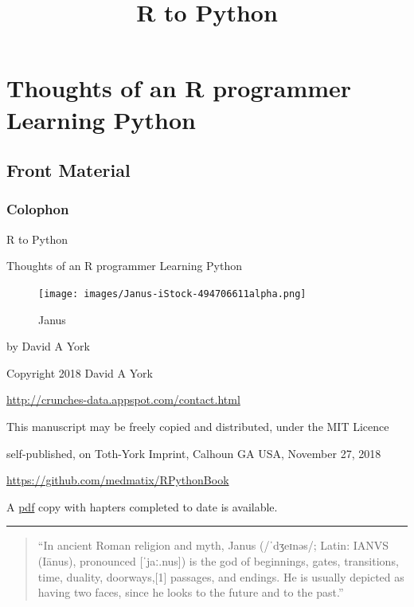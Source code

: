 \documentclass[]{book}
\title{R to Python}
\author{}
\date{}
\theoremstyle{definition}
\theoremstyle{definition}
\theoremstyle{definition}
\theoremstyle{remark}
\begin{document}
\maketitle

{
\setcounter{tocdepth}{1}
\tableofcontents
}
\part{Thoughts of an R programmer Learning
Python}\label{part-thoughts-of-an-r-programmer-learning-python}

\chapter{Front Material}\label{front-material}

\section{Colophon}\label{colophon}

R to Python

Thoughts of an R programmer Learning Python

\begin{figure}
\centering
\texttt{[image: images/Janus-iStock-494706611alpha.png]}
\caption{Janus}
\end{figure}

by David A York

Copyright 2018 David A York

\url{http://crunches-data.appspot.com/contact.html}

This manuscript may be freely copied and distributed, under the MIT
Licence

self-published, on Toth-York Imprint, Calhoun GA USA, November 27, 2018

\url{https://github.com/medmatix/RPythonBook}

A \href{RPythonBookc.pdf}{pdf} copy with hapters completed to date is
available.

\begin{center}\rule{0.5\linewidth}{\linethickness}\end{center}

\begin{quote}
``In ancient Roman religion and myth, Janus (/ˈdʒeɪnəs/; Latin: IANVS
(Iānus), pronounced {[}ˈjaː.nus{]}) is the god of beginnings, gates,
transitions, time, duality, doorways,{[}1{]} passages, and endings. He
is usually depicted as having two faces, since he looks to the future
and to the past.''
\end{quote}
\end{document}
